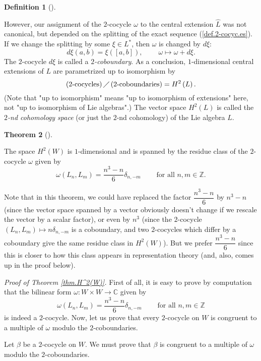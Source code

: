\documentclass
[numbers=enddot,12pt,final,onecolumn,german,notitlepage]{scrartcl}%
\theoremstyle{definition}
\newtheorem{theo}{Theorem}
\newenvironment{theorem}[1][]
{\begin{theo}[#1]\begin{leftbar}}
{\end{leftbar}\end{theo}}
\newtheorem{defi}[theo]{Definition}
\newenvironment{definition}[1][]
{\begin{defi}[#1]\begin{leftbar}}
{\end{leftbar}\end{defi}}
\begin{document}
\begin{definition}
However, our assignment of the $2$-cocycle $\omega$ to the central extension
$\widehat{L}$ was not canonical, but depended on the splitting of the exact
sequence (\ref{def.2-cocyc.es}). If we change the splitting by some $\xi\in
L^{\ast}$, then $\omega$ is changed by $d\xi$:
\[
d\xi\left(  a,b\right)  =\xi\left(  \left[  a,b\right]  \right)
,\ \ \ \ \ \ \ \ \ \ \omega\mapsto\omega+d\xi.
\]
The $2$-cocycle $d\xi$ is called a $2$\textit{-coboundary}. As a conclusion,
$1$-dimensional central extensions of $L$ are parametrized up to isomorphism
by%
\[
\left(  2\text{-cocycles}\right)  \diagup\left(  2\text{-coboundaries}\right)
=H^{2}\left(  L\right)  .
\]
(Note that "up to isomorphism" means "up to isomorphism of extensions" here,
not "up to isomorphism of Lie algebras".) The vector space $H^{2}\left(
L\right)  $ is called the $2$\textit{-nd cohomology space} (or just the $2$-nd
cohomology) of the Lie algebra $L$.
\end{definition}

\begin{theorem}
\label{thm.H^2(W)}The space $H^{2}\left(  W\right)  $ is $1$-dimensional and
is spanned by the residue class of the $2$-cocycle $\omega$ given by%
\[
\omega\left(  L_{n},L_{m}\right)  =\dfrac{n^{3}-n}{6}\delta_{n,-m}%
\ \ \ \ \ \ \ \ \ \ \text{for all }n,m\in\mathbb{Z}.
\]

\end{theorem}

Note that in this theorem, we could have replaced the factor $\dfrac{n^{3}%
-n}{6}$ by $n^{3}-n$ (since the vector space spanned by a vector obviously
doesn't change if we rescale the vector by a scalar factor), or even by
$n^{3}$ (since the $2$-cocycle $\left(  L_{n},L_{m}\right)  \mapsto
n\delta_{n,-m}$ is a coboundary, and two $2$-cocycles which differ by a
coboundary give the same residue class in $H^{2}\left(  W\right)  $). But we
prefer $\dfrac{n^{3}-n}{6}$ since this is closer to how this class appears in
representation theory (and, also, comes up in the proof below).

\textit{Proof of Theorem \ref{thm.H^2(W)}.} First of all, it is easy to prove
by computation that the bilinear form $\omega:W\times W\rightarrow\mathbb{C}$
given by%
\[
\omega\left(  L_{n},L_{m}\right)  =\dfrac{n^{3}-n}{6}\delta_{n,-m}%
\ \ \ \ \ \ \ \ \ \ \text{for all }n,m\in\mathbb{Z}%
\]
is indeed a $2$-cocycle. Now, let us prove that every $2$-cocycle on $W$ is
congruent to a multiple of $\omega$ modulo the $2$-coboundaries.

Let $\beta$ be a $2$-cocycle on $W$. We must prove that $\beta$ is congruent
to a multiple of $\omega$ modulo the $2$-coboundaries.
\end{document}
